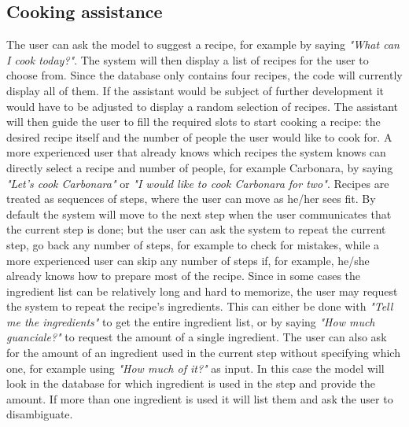 \documentclass[journal, 11pt]{IEEEtran}
\begin{document}
\subsection{Cooking assistance}
The user can ask the model to suggest a recipe, for example by saying \textit{"What can I cook today?"}.
The system will then display a list of recipes for the user to choose from. Since the database only contains four recipes, the code will currently display all of them. If the assistant would be subject of further development it would have to be adjusted to display a random selection of recipes.
The assistant will then guide the user to fill the required slots to start cooking a recipe: the desired recipe itself and the number of people the user would like to cook for.
A more experienced user that already knows which recipes the system knows can directly select a recipe and number of people, for example Carbonara, by saying \textit{"Let's cook Carbonara"} or \textit{"I would like to cook Carbonara for two"}.
Recipes are treated as sequences of steps, where the user can move as he/her sees fit.
By default the system will move to the next step when the user communicates that the current step is done; but the user can ask the system to repeat the current step, go back any number of steps, for example to check for mistakes, while a more experienced user can skip any number of steps if, for example, he/she already knows how to prepare most of the recipe.
Since in some cases the ingredient list can be relatively long and hard to memorize, the user may request the system to repeat the recipe's ingredients.
This can either be done with \textit{"Tell me the ingredients"} to get the entire ingredient list, or by saying \textit{"How much guanciale?"} to request the amount of a single ingredient.
The user can also ask for the amount of an ingredient used in the current step without specifying which one, for example using \textit{"How much of it?"} as input.
In this case the model will look in the database for which ingredient is used in the step and provide the amount. If more than one ingredient is used it will list them and ask the user to disambiguate.
\end{document}

